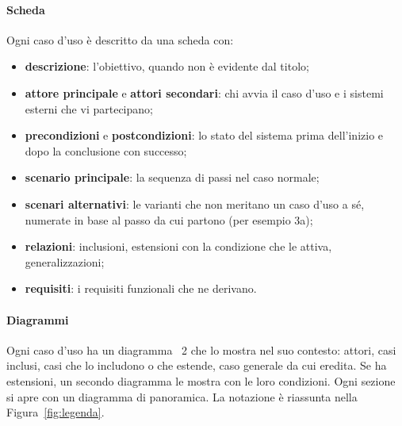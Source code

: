 \documentclass[documento]{gpt}
\begin{document}
\paragraph{Scheda} Ogni caso d'uso è descritto da una scheda con:
\begin{itemize}
  \item \textbf{descrizione}: l'obiettivo, quando non è evidente dal titolo;
  \item \textbf{attore principale} e \textbf{attori secondari}: chi avvia il caso
        d'uso e i sistemi esterni che vi partecipano;
  \item \textbf{precondizioni} e \textbf{postcondizioni}: lo stato del sistema
        prima dell'inizio e dopo la conclusione con successo;
  \item \textbf{scenario principale}: la sequenza di passi nel caso normale;
  \item \textbf{scenari alternativi}: le varianti che non meritano un caso d'uso
        a sé, numerate in base al passo da cui partono (per esempio 3a);
  \item \textbf{relazioni}: inclusioni, estensioni con la condizione che le
        attiva, generalizzazioni;
  \item \textbf{requisiti}: i requisiti funzionali che ne derivano.
\end{itemize}

\paragraph{Diagrammi} Ogni caso d'uso ha un diagramma ~2 che lo mostra nel suo
contesto: attori, casi inclusi, casi che lo includono o che estende, caso
generale da cui eredita. Se ha estensioni, un secondo diagramma le mostra con le
loro condizioni. Ogni sezione si apre con un diagramma di panoramica. La
notazione è riassunta nella Figura~\ref{fig:legenda}.
\end{document}
